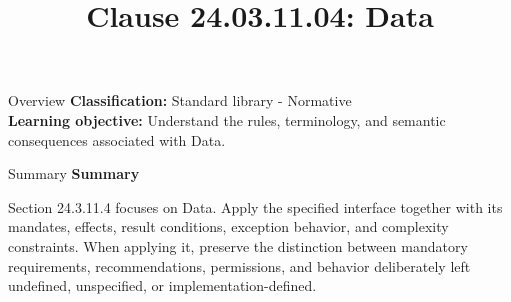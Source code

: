 \documentclass[10pt,letterpaper]{article}
\title{Clause 24.03.11.04: Data}
\author{}
\date{}
\begin{document}
\maketitle
\begin{CornellOverviewBox}{Overview}
\textbf{Classification:} Standard library - Normative\\[2pt]
\textbf{Learning objective:} Understand the rules, terminology, and semantic consequences associated with Data.
\end{CornellOverviewBox}\begin{CornellSummaryBox}{Summary}
{\sffamily\bfseries\color{Accent} Summary}\par\vspace{3pt}Section 24.3.11.4 focuses on Data. Apply the specified interface together with its mandates, effects, result conditions, exception behavior, and complexity constraints. When applying it, preserve the distinction between mandatory requirements, recommendations, permissions, and behavior deliberately left undefined, unspecified, or implementation-defined.
\end{CornellSummaryBox}
\end{document}
